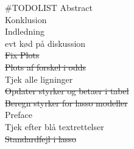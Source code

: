 \documentclass[11pt,a4paper]{article}
\renewcommand*\contentsname{Table of Contents}
\begin{document}
\clearpage
\renewcommand{\contentsname}{Indhold}
\clearpage
\tableofcontents
\clearpage
\newpage
{}
\#TODOLIST
Abstract\\
Konklusion\\
Indledning\\
evt kød på diskussion\\
\sout{Fix Plots}\\
\sout{Plots af forskel i odds} \\
Tjek alle ligninger \\
\sout{Opdater styrker og betaer i tabel}\\
\sout{Beregn styrker for lasso modeller} \\
Preface \\
Tjek efter blå textrettelser \\
\sout{Standardfejl i lasso} \\
\end{document}
